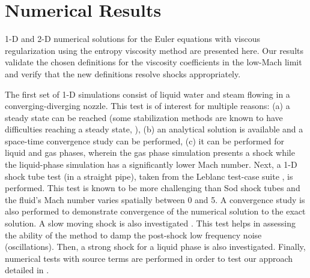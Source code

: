 \section{Numerical Results} \label{sec:results}

1-D and 2-D numerical solutions for the Euler equations with viscous regularization using the entropy viscosity method are presented here.
Our results validate the chosen definitions for the viscosity coefficients in the low-Mach limit and verify that the new definitions resolve shocks appropriately. 

The first set of 1-D simulations consist of liquid water and steam flowing in a converging-diverging nozzle. This test is of interest for multiple reasons: (a) a steady state can be reached (some stabilization methods are known to have difficulties reaching a steady state, \cite{FluxLimiter, FluxLimiter2}), (b) an analytical solution is available and a space-time convergence study can be performed, (c) it can be performed for liquid and gas phases, wherein the gas phase simulation presents a shock while the liquid-phase simulation has a significantly lower Mach number.
%
Next, a 1-D shock tube test (in a straight pipe), taken from the Leblanc test-case suite \cite{Leblanc}, is performed. This test is known to be more challenging than Sod shock tubes and the fluid's Mach number varies spatially between 0 and 5. A convergence study is also performed to demonstrate convergence of the numerical solution to the exact solution. 
%
A slow moving shock is also investigated \cite{james}. This test helps in assessing the ability of the method to damp the post-shock low frequency noise (oscillations). 
%
Then, a strong shock for a liquid phase is also investigated\cite{abgrall}.
%
Finally, numerical tests with source terms are performed in order to test our approach detailed in .


